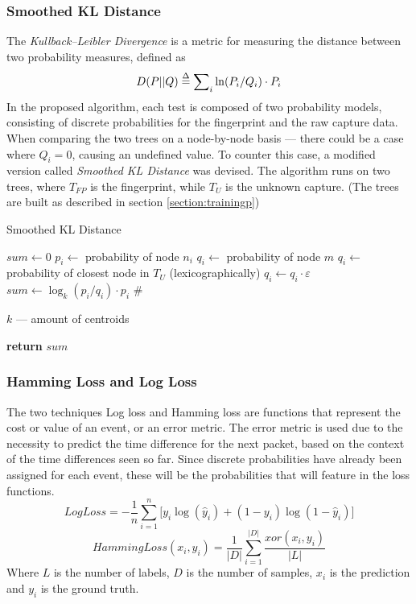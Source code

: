 \documentclass[9pt,journal,compsoc]{IEEEtran}
\newcommand\LONGCOMMENT[1]{%
  \hfill\#\ \begin{minipage}[t]{\eqboxwidth{COMMENT}}#1\strut\end{minipage}%
}
\begin{document}
\subsubsection{Smoothed KL Distance}
The \emph{Kullback--Leibler Divergence} is a metric for measuring the distance between two probability measures, defined as 
\begin{equation}\label{eq:kld}
D(P||Q) \buildrel \Delta \over = \sum\nolimits_i {\ln ({P_i}/{Q_i}) \cdot {P_i}}
\end{equation}
In the proposed algorithm, each test is composed of two probability models, consisting of discrete probabilities for the fingerprint and the raw capture data. When comparing the two trees on a node-by-node basis --- there could be a case where $Q_i=0$, causing an undefined value.
To counter this case, a modified version called \emph{Smoothed KL Distance} was devised.
The algorithm runs on two trees, where $T_{FP}$ is the fingerprint, while $T_U$ is the unknown capture.
(The trees are built as described in section \ref{section:trainingp})
\begin{algorithm}
\caption{Smoothed KL Distance}\label{kld}
\begin{algorithmic}[1]
\State $sum\gets0$
      \State $p_i\gets$ probability of node $n_i$
      	\State $q_i\gets$ probability of node $m$
      \Else
      	\State $q_i\gets$ probability of closest node in $T_U$ (lexicographically)
      	\State $q_i\gets q_i\cdot\varepsilon$
      \EndIf
   \State$sum\gets
   \log_k (p_i/q_i) \cdot {p_i}$\LONGCOMMENT{$k$ --- amount of centroids}
   \EndFor\label{euclidendwhile}
   \State \textbf{return} $sum$
\EndProcedure
\end{algorithmic}
\end{algorithm}
\subsubsection{Hamming Loss and Log Loss}
The two techniques Log loss \cite{Bis06} and Hamming loss \cite{Tso07, Ham50} are functions that represent the cost or value of an event, or an error metric.
The error metric is used due to the necessity to predict the time difference for the next packet, based on the context of the time differences seen so far.
Since discrete probabilities have already been assigned for each event, these will be the probabilities that will feature in the loss functions.
\begin{equation}\label{eq:ll}
LogLoss =  - \frac{1}{n}\sum\limits_{i = 1}^n {[{y_i}\log ({{\hat y}_i}) + (1 - {y_i})\log } (1 - {\hat y_i})]
\end{equation}
\begin{equation}\label{eq:hl}
HammingLoss({x_i},{y_i}) = \frac{1}{{\left| D \right|}}\sum\limits_{i = 1}^{\left| D \right|} {\frac{{xor({x_i},{y_i})}}{{\left| L \right|}}}
\end{equation}
Where $L$ is the number of labels, $D$ is the number of samples, $x_i$ is the prediction and $y_i$ is the ground truth.
\end{document}
